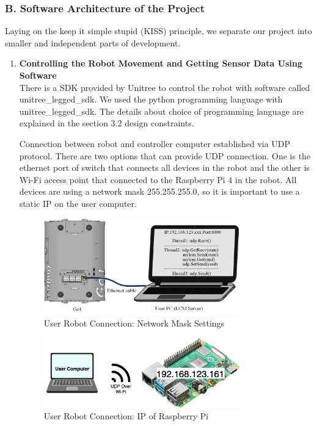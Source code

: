 \documentclass[12pt]{article}
\begin{document}
    \subsubsection*{B. Software Architecture of the Project}

    Laying on the keep it simple stupid (KISS) principle, we separate our project into smaller and independent parts of development.  

    \begin{enumerate}
        \item \textbf{Controlling the Robot Movement and Getting Sensor Data Using Software} \\
        There is a SDK provided by Unitree to control the robot with software called unitree\_legged\_sdk. We used the python programming language with unitree\_legged\_sdk. The details about choice of programming language are explained in the section 3.2 design constraints. 

        Connection between robot and controller computer established via UDP protocol. There are two options that can provide UDP connection. One is the ethernet port of switch that connects all devices in the robot and the other is Wi-Fi access point that connected to the Raspberry Pi 4 in the robot. All devices are using a network mask 255.255.255.0, so it is important to use a static IP on the user computer. 

        \begin{figure}[H]
            \centering
            \includegraphics[width=0.8\textwidth]{UserRobotConnection.png}
            \caption{User Robot Connection: Network Mask Settings}
        \end{figure}

        \begin{figure}[H]
            \centering
            \includegraphics[width=0.8\textwidth]{UserRPiConn.png}
            \caption{User Robot Connection: IP of Raspberry Pi}
        \end{figure}


\end{enumerate}
\end{document}
